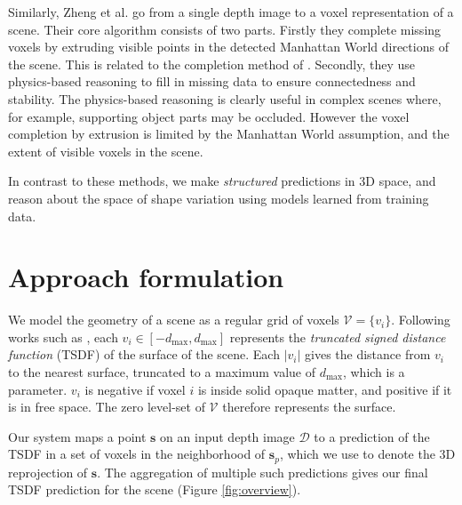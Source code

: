 \documentclass[10pt,twocolumn,letterpaper]{article}
\makeatletter
\newcommand*{\ea}{et al.\@\xspace}
\newcommand{\rgbdimage}{\mathcal{D}}
\newcommand{\pixelidx}{\mathbf{s}}
\newcommand{\voxelgrid}{\mathcal{V}}
\newcommand{\voxel}{v}
\newcommand{\voxidx}{i}
\makeatother
\begin{document}
Similarly,  Zheng \ea \cite{zheng-cvpr-2013} go from a single depth image to a voxel representation of a scene.
Their core algorithm consists of two parts.
Firstly they complete missing voxels by extruding visible points in the detected Manhattan World directions of the scene.
This is related to the completion method of \cite{kroemer-humanoids-2012}.
Secondly, they use physics-based reasoning to fill in missing data to ensure connectedness and stability.
The physics-based reasoning is clearly useful in complex scenes where, for example, supporting object parts may be occluded.
However the voxel completion by extrusion is limited by the Manhattan World assumption, and the extent of visible voxels in the scene.

In contrast to these methods, we make \emph{structured} predictions in 3D space, and reason about the space of shape variation using models learned from training data.






\section{Approach formulation}


We model the geometry of a scene as a regular grid of voxels $\voxelgrid = \{\voxel_\voxidx\}$.
Following works such as \cite{izadi-uist-2011, prisacariu-iccv-2011}, each $\voxel_\voxidx \in [-d_{\max}, d_{\max}]$ represents the \emph{truncated signed distance function} (TSDF) of the surface of the scene.
Each $|\voxel_\voxidx|$ gives the distance from $\voxel_\voxidx$ to the nearest surface, truncated to a maximum value of $d_{\max}$, which is a parameter.
$\voxel_\voxidx$ is negative if voxel $\voxidx$ is inside solid opaque matter, and positive if it is in free space.
The zero level-set of $\voxelgrid$ therefore represents the surface.

\newcommand{\voxregion}{\mathcal{R}}

Our system maps a point $\pixelidx$ on an input depth image $\rgbdimage$ to a prediction of the TSDF in a set of voxels in the neighborhood of $\pixelidx_p$, which we use to denote the 3D reprojection of $\pixelidx$.
The aggregation of multiple such predictions gives our final TSDF prediction for the scene (Figure \ref{fig:overview}).
\end{document}
